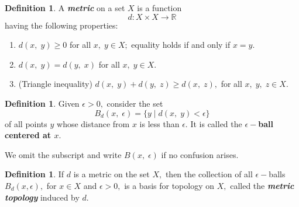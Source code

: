 \documentclass{article}
\theoremstyle{definition}
\newtheorem{defn}[theorem]{Definition}
\begin{document}
%
\begin{defn} 
  A \textbf{\emph{metric}} on a set $X$ is a function
  \[d:X\times X\longrightarrow \mathbb{R}\]
  having the following properties:
  \begin{enumerate}[nosep] 
    \item $d(x,\; y) \ge 0$ for all $x,\; y \in X;$ equality holds if and only if $x = y.$
    \item $d(x,\; y) = d(y,\; x)$ for all $x,\; y\in X.$
    \item (Triangle inequality) $d(x,\; y) + d(y,\; z) \ge d(x,\; z),$ for all $x,\; y,\; z \in X.$
  \end{enumerate}
\end{defn}
%
\begin{defn} 
  Given $\epsilon > 0,$ consider the set
  \[B_{d}(x,\; \epsilon)=\{y \;|\; d(x,\; y)<\epsilon\}\]
  of all points $y$ whose distance from $x$ is less than $\epsilon.$ It is called the \textbf{$\epsilon-$ball centered at $x.$}
\end{defn}
We omit the subscript and write $B(x, \;\epsilon)$ if no confusion arises.
%
\begin{defn} 
  If $d$ is a metric on the set $X,$ then the collection of all $\epsilon-$balls $B_d(x, \epsilon),$ for $x\in X$ and $\epsilon>0,$ is a basis for topology on $X,$ called the \textbf{\emph{metric topology}} induced by $d.$
\end{defn}
\end{document}
